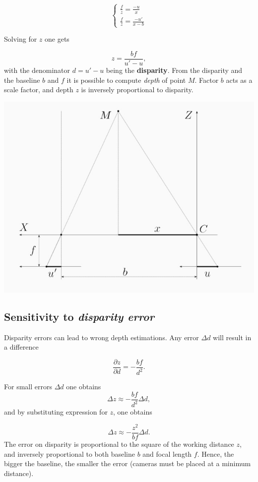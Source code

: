 \documentclass[10pt]{report}
\begin{document}
\[ \left\{\begin{array}{ll} \frac{f}{z} = \frac{-u}{x}\\ \frac{f}{z} = \frac{-u'}{x - b} \end{array} \right. \]

Solving for \(z\) one gets

\[z = \frac{bf}{u' - u},\] with the denominator \(d = u' - u\) being the
\textbf{disparity}. From the disparity and the baseline \(b\) and \(f\) it is
possible to compute \emph{depth} of point \(M\). Factor \(b\) acts as a scale
factor, and depth \(z\) is inversely proportional to disparity.

\begin{center}
\includegraphics[width=.9\linewidth]{./pics/stereo/triangulation.jpg}
\end{center}

\subsection{Sensitivity to \emph{disparity error}}
\label{sec:org3b9d529}
Disparity errors can lead to wrong depth estimations. Any error
\(\Delta d\) will result in a difference

\[\frac{\partial z}{\partial d} = -\frac{bf}{d^2}.\]

For small errors \(\Delta d\) one obtains
\[ \Delta z \approx -\frac{bf}{d^2} \Delta d,\] and by substituting
expression for \(z\), one obtains

\[ \Delta z \approx -\frac{z^2}{bf} \Delta d.\] The error on disparity
is proportional to the square of the working distance \(z\), and
inversely proportional to both baseline \(b\) and focal length \(f\).
Hence, the bigger the baseline, the smaller the error (cameras must be
placed at a minimum distance).
\end{document}
